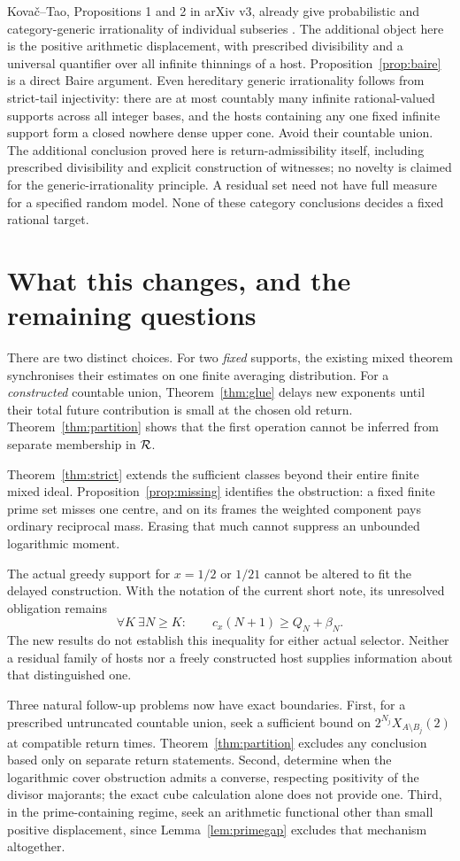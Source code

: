 \documentclass[11pt,a4paper]{article}
\theoremstyle{definition}\newtheorem{definition}[theorem]{Definition}
\theoremstyle{remark}\newtheorem{remark}[theorem]{Remark}
\begin{document}
Kova\v{c}--Tao, Propositions 1 and 2 in arXiv v3, already give probabilistic and category-generic irrationality of individual subseries \cite{kt}. The additional object here is the positive arithmetic displacement, with prescribed divisibility and a universal quantifier over all infinite thinnings of a host. Proposition~\ref{prop:baire} is a direct Baire argument.
Even hereditary generic irrationality follows from strict-tail injectivity:
there are at most countably many infinite rational-valued supports across
all integer bases, and the hosts containing any one fixed infinite support
form a closed nowhere dense upper cone. Avoid their countable union.
The additional conclusion proved here is return-admissibility itself,
including prescribed divisibility and explicit construction of witnesses;
no novelty is claimed for the generic-irrationality principle. A residual set need not have full measure for a specified random model. None of these category conclusions decides a fixed rational target.

\section{What this changes, and the remaining questions}
There are two distinct choices. For two \emph{fixed} supports, the existing mixed theorem synchronises their estimates on one finite averaging distribution. For a \emph{constructed} countable union, Theorem~\ref{thm:glue} delays new exponents until their total future contribution is small at the chosen old return. Theorem~\ref{thm:partition} shows that the first operation cannot be inferred from separate membership in $\mathcal R$.

Theorem~\ref{thm:strict} extends the sufficient classes beyond their entire finite mixed ideal. Proposition~\ref{prop:missing} identifies the obstruction: a fixed finite prime set misses one centre, and on its frames the weighted component pays ordinary reciprocal mass. Erasing that much cannot suppress an unbounded logarithmic moment.

The actual greedy support for $x=1/2$ or $1/21$ cannot be altered to fit the delayed construction. With the notation of the current short note, its unresolved obligation remains
\[
 \forall K\ \exists N\ge K:\qquad
 c_x(N+1)\ge Q_N+\beta_N.
\]
The new results do not establish this inequality for either actual selector. Neither a residual family of hosts nor a freely constructed host supplies information about that distinguished one.

Three natural follow-up problems now have exact boundaries. First, for a prescribed untruncated countable union, seek a sufficient bound on $2^{N_j}X_{A\setminus B_j}(2)$ at compatible return times. Theorem~\ref{thm:partition} excludes any conclusion based only on separate return statements. Second, determine when the logarithmic cover obstruction admits a converse, respecting positivity of the divisor majorants; the exact cube calculation alone does not provide one. Third, in the prime-containing regime, seek an arithmetic functional other than small positive displacement, since Lemma~\ref{lem:primegap} excludes that mechanism altogether.
\end{document}
